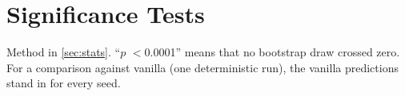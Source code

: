 \chapter{Significance Tests}\label{app:significance}

Method in \cref{sec:stats}. ``$p$ $<$0.0001'' means that no bootstrap draw crossed zero. For a comparison against
vanilla (one deterministic run), the vanilla predictions stand in for every seed.





